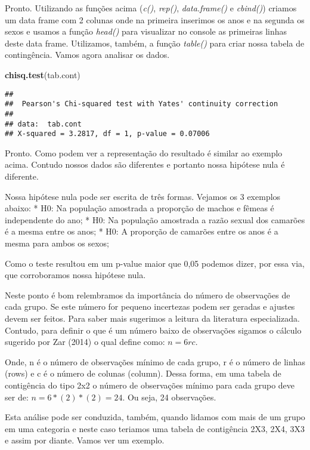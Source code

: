 \documentclass[]{book}
\newenvironment{Shaded}{\begin{snugshade}}{\end{snugshade}}
\newcommand{\KeywordTok}[1]{\textcolor[rgb]{0.13,0.29,0.53}{\textbf{#1}}}
\newcommand{\NormalTok}[1]{#1}
\begin{document}
Pronto. Utilizando as funções acima (\emph{c()}, \emph{rep()}, \emph{data.frame()} e \emph{cbind()}) criamos um data frame com 2 colunas onde na primeira inserimos os anos e na segunda os sexos e usamos a função \emph{head()} para visualizar no console as primeiras linhas deste data frame. Utilizamos, também, a função \emph{table()} para criar nossa tabela de contingência. Vamos agora analisar os dados.

\begin{Shaded}
\begin{Highlighting}[]
\KeywordTok{chisq.test}\NormalTok{(tab.cont)}
\end{Highlighting}
\end{Shaded}

\begin{verbatim}
## 
##  Pearson's Chi-squared test with Yates' continuity correction
## 
## data:  tab.cont
## X-squared = 3.2817, df = 1, p-value = 0.07006
\end{verbatim}

Pronto. Como podem ver a representação do resultado é similar ao exemplo acima. Contudo nossos dados são diferentes e portanto nossa hipótese nula é diferente.

Nossa hipótese nula pode ser escrita de três formas. Vejamos os 3 exemplos abaixo:
* H0: Na população amostrada a proporção de machos e fêmeas é independente do ano;
* H0: Na população amostrada a razão sexual dos camarões é a mesma entre os anos;
* H0: A proporção de camarões entre os anos é a mesma para ambos os sexos;

Como o teste resultou em um p-value maior que 0,05 podemos dizer, por essa via, que corroboramos nossa hipótese nula.

Neste ponto é bom relembramos da importância do número de observações de cada grupo. Se este número for pequeno incertezas podem ser geradas e ajustes devem ser feitos. Para saber mais sugerimos a leitura da literatura especializada. Contudo, para definir o que é um número baixo de observações sigamos o cálculo sugerido por Zar (2014) o qual define como: \(n = 6rc\).

Onde, n é o número de observações mínimo de cada grupo, r é o número de linhas (rows) e c é o número de colunas (column). Dessa forma, em uma tabela de contigência do tipo 2x2 o número de observações mínimo para cada grupo deve ser de: \(n = 6*(2)*(2) = 24\). Ou seja, 24 observações.

Esta análise pode ser conduzida, também, quando lidamos com mais de um grupo em uma categoria e neste caso teriamos uma tabela de contigência 2X3, 2X4, 3X3 e assim por diante. Vamos ver um exemplo.
\end{document}
